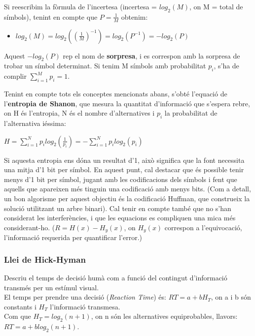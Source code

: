 \documentclass[12pt]{article}
\begin{document}
    \hfill \break
    Si reescribim la fòrmula de l'incertesa (incertesa = $log_2(M)$, on M = total de símbols), tenint en compte que 
    $P = \frac{1}{M}$ obtenim:
    \begin{itemize}
        \item $log_{2}(M) = log_{2}((\frac{1}{M})^{-1}) = log_{2}(P^{-1}) = -log_{2}(P)$
    \end {itemize}
    Aquest $-log_{2}(P)$ rep el nom de \textbf{sorpresa}, i es correspon amb la sorpresa de trobar un símbol determinat.
    Si tenim M símbols amb probabilitat $p_{i}$, s'ha de complir $\sum_{i=1}^{M}p_{i} = 1$.

    \newpage
    Tenint en compte tots els conceptes mencionats abans, s'obté l'equació de l'\textbf{entropia de Shanon}, que mesura la quantitat
    d'informació que s'espera rebre, on H és l'entropia, N és el nombre d'alternatives i $p_{i}$ la probabilitat de
    l'alternativa iéssima: \hfill \break

    $H = \sum_{i=1}^{N}p_{i}log_{2}(\frac{1}{p_{i}}) = -\sum_{i=1}^{N}p_{i}log_{2}(p_{i})$

    \hfill \break

    Si aquesta entropia ens dóna un resultat d'1, això significa que la font necessita una mitja d'1 bit per símbol.
    En aquest punt, cal destacar que és possible tenir menys d'1 bit per símbol, jugant amb les codificacions dels símbols
    i fent que aquells que apareixen més tinguin una codificació amb menys bits. (Com a detall, un bon algorisme per aquest objectiu 
    és la codificació Huffman, que construeix la solució utilitzant un arbre binari). Cal tenir en compte també que no s'han considerat
    les interferències, i que les equacions es compliquen una mica més considerant-ho. ($R = H(x) - H_{y}(x)$, on $H_y(x)$ 
    correspon a l'equivocació, l'informació requerida per quantificar l'error.)
    

    \subsubsection{Llei de Hick-Hyman}
    Descriu el temps de decisió humà com a funció del contingut d'informació transmés per un estímul visual.
    \hfill \break \\
    El temps per prendre una decisió (\textit{Reaction Time}) és: $RT = a + bH_T$, on a i b són constants i $H_T$ l'informació transmesa.
    \\
    Com que $H_T = log_2(n+1)$, on n són les alternatives equiprobables, llavors: $RT = a + blog_2(n+1)$.
\end{document}
